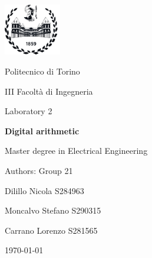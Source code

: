 \documentclass[10pt,  english, makeidx, a4paper, titlepage, oneside]{book}
\begin{document}
\frontmatter
\begin{titlepage}
\vspace{2cm}
\centerline{
\includegraphics[width=2.5cm]{./logopoli_new.png}}  
\centerline{\LARGE Politecnico di Torino}
\bigskip
\centerline{\Large III Facolt\`a di Ingegneria}
\vspace{4cm}
\centerline{\Huge\sf Laboratory 2}
\bigskip
\centerline{\Huge\bfseries\sf Digital arithmetic}
\vspace{2cm}
\centerline{\LARGE Master degree in Electrical Engineering}
\vspace{4.4cm}
%
\centerline{\Large Authors: Group 21}
\vspace{2cm}
%
%
\centerline{Dilillo Nicola S284963}
\centerline{Moncalvo Stefano S290315}
\centerline{Carrano Lorenzo S281565}
%
\vspace{2cm}
\centerline{\today}
\vspace{1cm}
\end{titlepage}

\tableofcontents

% 
\mainmatter
\lstset{language=VHDL}

%    
%



% 
%
%    
%
%
%
%
 
\end{document}
